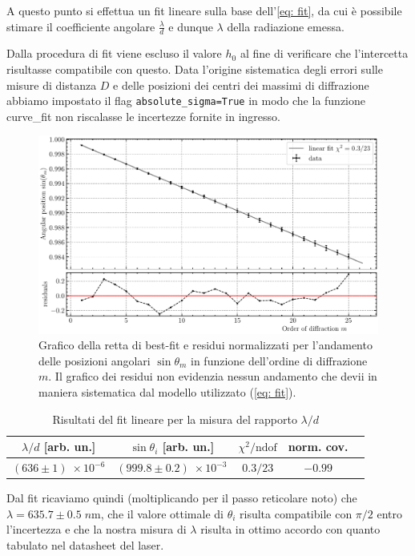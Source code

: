 \documentclass[10pt, a4paper, italian]{article}
\begin{document}
A questo punto si effettua un fit lineare sulla base dell'\cref{eq: fit},
da cui è possibile stimare il coefficiente angolare $\frac{\lambda}{d}$ e
dunque $\lambda$ della radiazione emessa.

Dalla procedura di fit viene escluso il valore $h_0$ al fine di verificare che
l'intercetta risultasse compatibile con questo.
Data l'origine sistematica degli errori sulle misure di distanza $D$ e delle
posizioni dei centri dei massimi di diffrazione abbiamo impostato il flag
\verb+absolute_sigma=True+ in modo che la funzione curve\_fit non riscalasse
le incertezze fornite in ingresso.

\begin{figure}
\includegraphics[width=\textwidth]{thetafit}
\caption{Grafico della retta di best-fit e residui normalizzati per
l'andamento delle posizioni angolari $\sin{\theta_m}$ in funzione dell'ordine
di diffrazione $m$. Il grafico dei residui non evidenzia nessun andamento
che devii in maniera sistematica dal modello utilizzato (\cref{eq: fit}).
\label{fig: linfit}}
\end{figure}

\begin{table}
\centering
\begin{tabular}{ccccc}
\toprule
$\lambda/d$ [arb. un.] & $\sin{\theta_i}$ [arb. un.] &
$\chi^2/\text{ndof}$ & norm. cov. \\
\midrule
$(636 \pm 1) \; \times 10^{-6}$ & $(999.8 \pm 0.2) \; \times 10^{-3}$ &
$0.3/23$ & $-0.99$ \\
\bottomrule
\end{tabular}
\caption{Risultati del fit lineare per la misura del rapporto $\lambda/d$
\label{tab: linfit}}
\end{table}

Dal fit ricaviamo quindi (moltiplicando per il passo reticolare noto) che
$\lambda = 635.7 \pm 0.5 \; \si{n\m}$, che il valore ottimale di $\theta_i$
risulta compatibile con $\pi/2$ entro l'incertezza e che la nostra misura di
$\lambda$ risulta in ottimo accordo con quanto tabulato nel datasheet del
laser.
\end{document}
